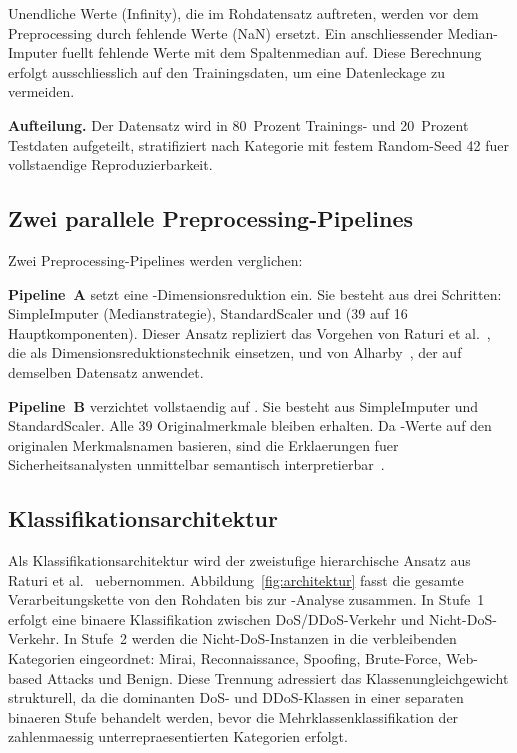Unendliche Werte (Infinity), die im Rohdatensatz auftreten, werden vor dem Preprocessing
durch fehlende Werte (NaN) ersetzt.
Ein anschliessender Median-Imputer fuellt fehlende Werte mit dem Spaltenmedian auf.
Diese Berechnung erfolgt ausschliesslich auf den Trainingsdaten, um eine Datenleckage zu
vermeiden.

\textbf{Aufteilung.}
Der Datensatz wird in 80~Prozent Trainings- und 20~Prozent Testdaten aufgeteilt, stratifiziert
nach Kategorie mit festem Random-Seed 42 fuer vollstaendige Reproduzierbarkeit.

\subsection{Zwei parallele Preprocessing-Pipelines}

Zwei Preprocessing-Pipelines werden verglichen:

\textbf{Pipeline~A} setzt eine \pca{}-Dimensionsreduktion ein.
Sie besteht aus drei Schritten: SimpleImputer (Medianstrategie), StandardScaler und
\pca{} (39 auf 16 Hauptkomponenten).
Dieser Ansatz repliziert das Vorgehen von Raturi et al.\ \cite{raturi2026exploratory}, die
\pca{} als Dimensionsreduktionstechnik einsetzen, und von Alharby~\cite{alharby2025ciciot},
der \pca{} auf demselben Datensatz anwendet.

\textbf{Pipeline~B} verzichtet vollstaendig auf \pca{}.
Sie besteht aus SimpleImputer und StandardScaler.
Alle 39 Originalmerkmale bleiben erhalten.
Da \shap{}-Werte auf den originalen Merkmalsnamen basieren, sind die Erklaerungen fuer
Sicherheitsanalysten unmittelbar semantisch interpretierbar~\cite{mohale2025xai}.

\subsection{Klassifikationsarchitektur}

Als Klassifikationsarchitektur wird der zweistufige hierarchische Ansatz aus Raturi et al.\
\cite{raturi2026exploratory} uebernommen.
Abbildung~\ref{fig:architektur} fasst die gesamte Verarbeitungskette von den Rohdaten bis zur
\shap{}-Analyse zusammen.
In Stufe~1 erfolgt eine binaere Klassifikation zwischen DoS/DDoS-Verkehr und
Nicht-DoS-Verkehr.
In Stufe~2 werden die Nicht-DoS-Instanzen in die verbleibenden Kategorien eingeordnet:
Mirai, Reconnaissance, Spoofing, Brute-Force, Web-based Attacks und Benign.
Diese Trennung adressiert das Klassenungleichgewicht strukturell, da die dominanten DoS- und
DDoS-Klassen in einer separaten binaeren Stufe behandelt werden, bevor die
Mehrklassenklassifikation der zahlenmaessig unterrepraesentierten Kategorien erfolgt.

